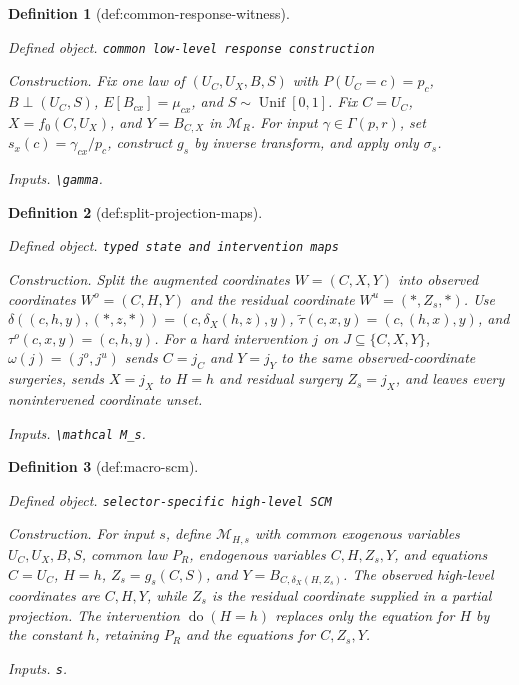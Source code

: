 \documentclass{article}
\newtheorem{definition}{Definition}
\begin{document}
\begin{definition}[def:common-response-witness]\label{def:common-response-witness}
\par\smallskip\noindent\emph{Defined object.} \texttt{common low-\allowbreak{}level response construction}
\par\smallskip\noindent\emph{Construction.} Fix one law of \((U_C,U_X,B,S)\) with \(P(U_C=c)=p_c\), \(B\perp(U_C,S)\), \(E[B_{cx}]=\mu_{cx}\), and \(S\sim\operatorname{Unif}[0,1]\). Fix \(C=U_C\), \(X=f_0(C,U_X)\), and \(Y=B_{C,X}\) in \(\mathcal M_R\). For input \(\gamma\in\Gamma(p,r)\), set \(s_x(c)=\gamma_{cx}/p_c\), construct \(g_s\) by inverse transform, and apply only \(\sigma_s\).
\par\smallskip\noindent\emph{Inputs.} \texttt{\textbackslash{}\allowbreak{}gamma}.
\end{definition}

\begin{definition}[def:split-projection-maps]\label{def:split-projection-maps}
\par\smallskip\noindent\emph{Defined object.} \texttt{typed state and intervention maps}
\par\smallskip\noindent\emph{Construction.} Split the augmented coordinates \(W=(C,X,Y)\) into observed coordinates \(W^o=(C,H,Y)\) and the residual coordinate \(W^u=(\ast,Z_s,\ast)\). Use \(\delta((c,h,y),(\ast,z,\ast))=(c,\delta_X(h,z),y)\), \(\widetilde\tau(c,x,y)=(c,(h,x),y)\), and \(\tau^o(c,x,y)=(c,h,y)\). For a hard intervention \(j\) on \(J\subseteq\{C,X,Y\}\), \(\omega(j)=(j^o,j^u)\) sends \(C=j_C\) and \(Y=j_Y\) to the same observed-coordinate surgeries, sends \(X=j_X\) to \(H=h\) and residual surgery \(Z_s=j_X\), and leaves every nonintervened coordinate unset.
\par\smallskip\noindent\emph{Inputs.} \texttt{\textbackslash{}\allowbreak{}mathcal M\_\allowbreak{}s}.
\end{definition}

\begin{definition}[def:macro-scm]\label{def:macro-scm}
\par\smallskip\noindent\emph{Defined object.} \texttt{selector-\allowbreak{}specific high-\allowbreak{}level SCM}
\par\smallskip\noindent\emph{Construction.} For input \(s\), define \(\mathcal M_{H,s}\) with common exogenous variables \(U_C,U_X,B,S\), common law \(P_R\), endogenous variables \(C,H,Z_s,Y\), and equations \(C=U_C\), \(H=h\), \(Z_s=g_s(C,S)\), and \(Y=B_{C,\delta_X(H,Z_s)}\). The observed high-level coordinates are \(C,H,Y\), while \(Z_s\) is the residual coordinate supplied in a partial projection. The intervention \(\operatorname{do}(H=h)\) replaces only the equation for \(H\) by the constant \(h\), retaining \(P_R\) and the equations for \(C,Z_s,Y\).
\par\smallskip\noindent\emph{Inputs.} \texttt{s}.
\end{definition}
\end{document}
